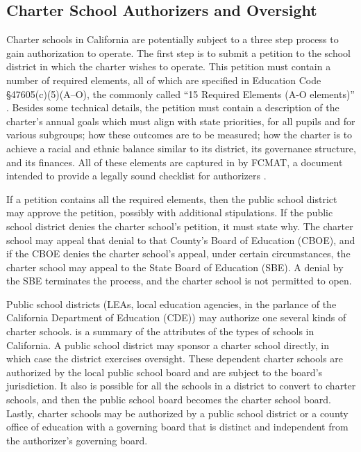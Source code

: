 \subsection{Charter School Authorizers and Oversight}\indent

Charter schools in California are potentially subject to a three step process to gain authorization to operate. The first step is to submit a petition to the school district in which the charter wishes to operate. This petition must contain a number of required elements, all of which are specified in Education Code §47605(c)(5)(A–O), the commonly called ``15 Required Elements (A-O elements)'' \parencite[89]{Aguinaldo.etal2021}. Besides some technical details, the petition must contain a description of the charter's annual goals which must align with state priorities, for all pupils and for various subgroups; how these outcomes are to be measured; how the charter is to achieve a racial and ethnic balance similar to its district, its governance structure, and its finances. All of these elements are captured in \textit{} by FCMAT, a document intended to provide a legally sound checklist for authorizers \parencite{FCMAT2022}.  %

If a petition contains all the required elements, then the public school district may approve the petition, possibly with additional stipulations. If the public school district denies the charter school's petition, it must state why. The charter school may appeal that denial to that County's Board of Education (CBOE), and if the CBOE denies the charter school's appeal, under certain circumstances, the charter school may appeal to the State Board of Education (SBE). A denial by the SBE terminates the process, and the charter school is not permitted to open.

Public school districts (LEAs, local education agencies, in the parlance of the California Department of Education (CDE)) may authorize one several kinds of charter schools.  is a summary of the attributes of the types of schools in California. A public school district may sponsor a charter school directly, in which case the district exercises oversight. These dependent charter schools are authorized by the local public school board and are subject to the board's jurisdiction. It also is possible for all the schools in a district to convert to charter schools, and then the public school board becomes the charter school board. Lastly, charter schools may be authorized by a public school district or a county office of education with a governing board that is distinct and independent from the authorizer's governing board.

